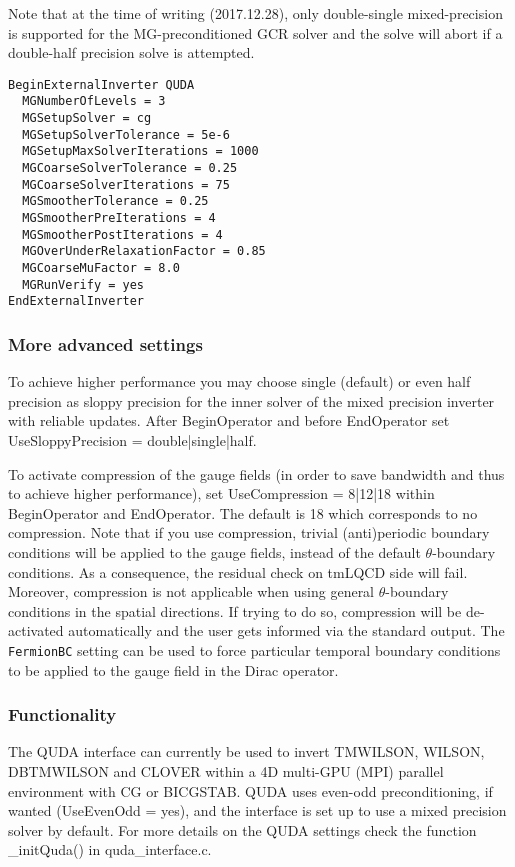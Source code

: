 Note that at the time of writing (2017.12.28), only double-single mixed-precision is supported for the MG-preconditioned GCR solver and the solve will abort if a double-half precision solve is attempted.

\begin{verbatim}
BeginExternalInverter QUDA
  MGNumberOfLevels = 3
  MGSetupSolver = cg
  MGSetupSolverTolerance = 5e-6
  MGSetupMaxSolverIterations = 1000
  MGCoarseSolverTolerance = 0.25
  MGCoarseSolverIterations = 75
  MGSmootherTolerance = 0.25
  MGSmootherPreIterations = 4
  MGSmootherPostIterations = 4
  MGOverUnderRelaxationFactor = 0.85
  MGCoarseMuFactor = 8.0
  MGRunVerify = yes
EndExternalInverter
\end{verbatim}

\subsubsection{More advanced settings}
To achieve higher performance you may choose single (default) or even half precision as sloppy precision for the inner solver of the mixed precision inverter with reliable updates. After {\ttfamily BeginOperator} and before {\ttfamily EndOperator} set {\ttfamily UseSloppyPrecision = double|single|half}.

To activate compression of the gauge fields (in order to save bandwidth and thus to achieve higher performance), set {\ttfamily UseCompression = 8|12|18} within {\ttfamily BeginOperator} and {\ttfamily EndOperator}. 
The default is 18 which corresponds to no compression. 
Note that if you use compression, trivial (anti)periodic boundary conditions will be applied to the gauge fields, instead of the default $\theta$-boundary conditions. 
As a consequence, the residual check on tmLQCD side will fail. 
Moreover, compression is not applicable when using general $\theta$-boundary conditions in the spatial directions. 
If trying to do so, compression will be de-activated automatically and the user gets informed via the standard output.
The \texttt{FermionBC} setting can be used to force particular temporal boundary conditions to be applied to the gauge field in the Dirac operator.

\subsubsection{Functionality}
The QUDA interface can currently be used to invert {\ttfamily TMWILSON, WILSON, DBTMWILSON} and {\ttfamily CLOVER} within a 4D multi-GPU (MPI) parallel environment with CG or BICGSTAB. QUDA uses even-odd preconditioning, if wanted ({\ttfamily UseEvenOdd = yes}), and the interface is set up to use a mixed precision solver by default. For more details on the QUDA settings check the function {\ttfamily \_initQuda()} in {\ttfamily quda\_interface.c}.



